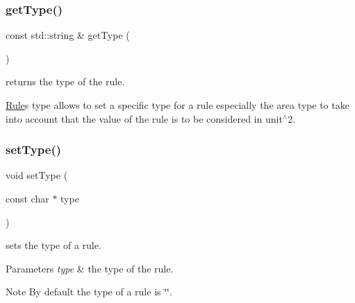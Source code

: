 \subsubsection{\texorpdfstring{get\+Type()}{getType()}}
{\footnotesize\ttfamily const std\+::string \& get\+Type (\begin{DoxyParamCaption}{ }\end{DoxyParamCaption})\hspace{0.3cm}{\ttfamily [inline]}}



returns the type of the rule. 

\hyperlink{class_d_t_r_1_1_rule}{Rule}\textquotesingle{}s type allows to set a specific type for a rule especially the \textquotesingle{}area\textquotesingle{} type to take into account that the value of the rule is to be considered in unit$^\wedge$2. \mbox{\label{class_d_t_r_1_1_rule_a3568407d7a7890c39b8c9acc1e608535}} 
\subsubsection{\texorpdfstring{set\+Type()}{setType()}}
{\footnotesize\ttfamily void set\+Type (\begin{DoxyParamCaption}\item[{const char $\ast$}]{type }\end{DoxyParamCaption})\hspace{0.3cm}{\ttfamily [inline]}}



sets the type of a rule. 


\begin{DoxyParams}{Parameters}
{\em type} & the type of the rule.\\
\hline
\end{DoxyParams}
\begin{DoxyNote}{Note}
By default the type of a rule is \char`\"{}\char`\"{}. 
\end{DoxyNote}
